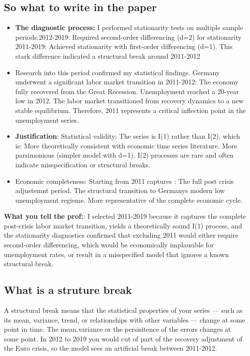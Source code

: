 \documentclass{article}
\begin{document}
\subsection{So what to write in the paper}
\begin{itemize}
    \item \textbf{The diagnostic process:} I performed stationarity tests on multiple sample periods:2012-2019: Required second-order differencing (d=2) for stationarity
    2011-2019: Achieved stationarity with first-order differencing (d=1). This stark difference indicated a structural break around 2011-2012
    \item Research into this period confirmed my statistical findings. Germany underwent a significant labor market transition in 2011-2012:
    The economy fully recovered from the Great Recession. Unemployment reached a 20-year low in 2012. The labor market transitioned from recovery dynamics to a new stable equilibrium. Therefore, 2011 represents a critical inflection point in the unemployment series.
    \item \textbf{Justification}: Statistical validity: The series is I(1) rather than I(2), which is: More theoretically consistent with economic time series literature. More parsimonious (simpler model with d=1). I(2) processes are rare and often indicate misspecification or structural breaks.
    \item Economic completeness: Starting from 2011 captures : The full post crisis adjustemnt period. The structural transition to Germanys modern low unemployment regieme. 
    More representative of the complete economic cycle. 
\end{itemize}
\textbf{What you tell the prof:}: I selected 2011-2019 because it captures the complete post-crisis labor market transition, yields a theoretically sound I(1) process, and the stationarity diagnostics confirmed that excluding 2011 would either require second-order differencing, which would be economically implausible for unemployment rates, or result in a misspecified model that ignores a known structural break. 
\subsection{What is a struture break}
A structural break means that the statistical properties of your series — such as its mean, variance, trend, or relationships with other variables — change at some point in time.
The mean,variance or the persisitence of the errors changes at some point. In 2012 to 2019 you would cut of part of the recovery adjustment of the Euro crisis, so the model sees an artificial break between 2011-2012.
\end{document}
